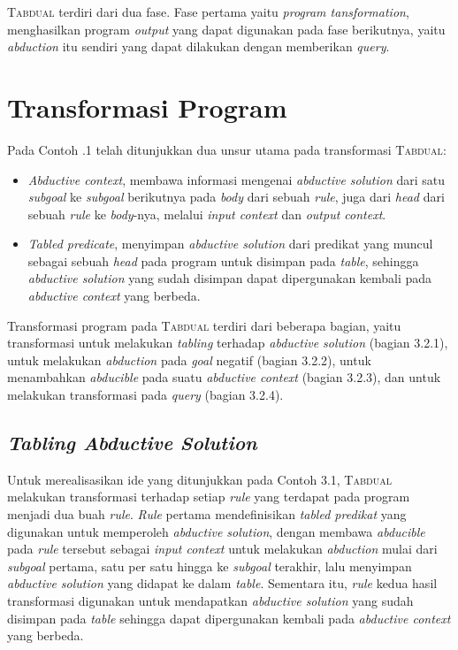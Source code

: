 \label{fase}
\textsc{Tabdual} terdiri dari dua fase. Fase pertama yaitu \textit{program tansformation}, menghasilkan program \textit{output} yang dapat digunakan pada fase berikutnya, yaitu \textit{abduction} itu sendiri yang dapat dilakukan dengan memberikan \textit{query}.

\section{Transformasi Program}
Pada Contoh \thebabTigaNum.1 telah ditunjukkan dua unsur utama pada transformasi \textsc{Tabdual}:

\begin{itemize}
	\item \textit{Abductive context}, membawa informasi mengenai \textit{abductive solution} dari satu \textit{subgoal} ke \textit{subgoal} berikutnya pada \textit{body} dari sebuah \textit{rule}, juga dari \textit{head} dari sebuah \textit{rule} ke \textit{body}-nya, melalui \textit{input context} dan \textit{output context}.
	\item \textit{Tabled predicate}, menyimpan \textit{abductive solution} dari predikat yang muncul sebagai sebuah \textit{head} pada program untuk disimpan pada \textit{table}, sehingga \textit{abductive solution} yang sudah disimpan dapat dipergunakan kembali pada \textit{abductive context} yang berbeda.
\end{itemize}

Transformasi program pada \textsc{Tabdual} terdiri dari beberapa bagian, yaitu transformasi untuk melakukan \textit{tabling} terhadap \textit{abductive solution} (bagian 3.2.1), untuk melakukan \textit{abduction} pada \textit{goal} negatif (bagian 3.2.2), untuk menambahkan \textit{abducible} pada suatu \textit{abductive context} (bagian 3.2.3), dan untuk melakukan transformasi pada \textit{query} (bagian 3.2.4).

\subsection{\textit{Tabling Abductive Solution}}

Untuk merealisasikan ide yang ditunjukkan pada Contoh 3.1, \textsc{Tabdual} melakukan transformasi terhadap setiap \textit{rule} yang terdapat pada program menjadi dua buah \textit{rule}. \textit{Rule} pertama mendefinisikan \textit{tabled predikat} yang digunakan untuk memperoleh \textit{abductive solution}, dengan membawa \textit{abducible} pada \textit{rule} tersebut sebagai \textit{input context} untuk melakukan \textit{abduction} mulai dari \textit{subgoal} pertama, satu per satu hingga ke \textit{subgoal} terakhir, lalu menyimpan \textit{abductive solution} yang didapat ke dalam \textit{table}. Sementara itu, \textit{rule} kedua hasil transformasi digunakan untuk mendapatkan \textit{abductive solution} yang sudah disimpan pada \textit{table} sehingga dapat dipergunakan kembali pada \textit{abductive context} yang berbeda.

